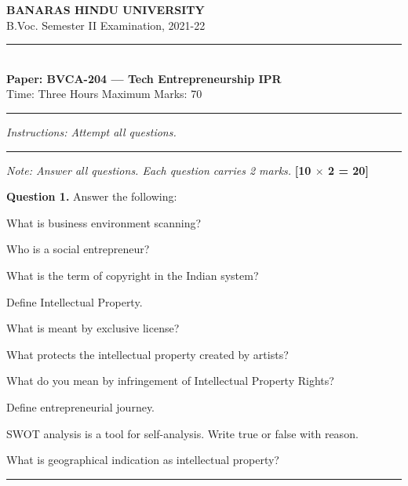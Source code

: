 \documentclass[11pt,a4paper]{article}
\begin{document}
\begin{center}
  {\large\bfseries BANARAS HINDU UNIVERSITY}\\[2pt]
  {\normalsize B.Voc. Semester II Examination, 2021-22}\\[6pt]
  \rule{0.8\linewidth}{0.5pt}\\[6pt]
  {\large\bfseries Paper: BVCA-204 --- Tech Entrepreneurship IPR}\\[4pt]
  {\normalsize Time: Three Hours \hfill Maximum Marks: 70}
\end{center}

\rule{\linewidth}{0.4pt}

\smallskip
\smallskip



\noindent   \textit{Instructions: Attempt all questions.}

\bigskip

\bigskip


\rule{\linewidth}{0.4pt}\smallskip




\noindent   \textit{Note: Answer all questions. Each question carries 2 marks.} \hfill   \textbf{[10 $ \times$ 2 = 20]}

\medskip


\noindent   \textbf{Question 1.} Answer the following:

\begin{parts}
  \item What is business environment scanning?
  \item Who is a social entrepreneur?
  \item What is the term of copyright in the Indian system?
  \item Define Intellectual Property.
  \item What is meant by exclusive license?
  \item What protects the intellectual property created by artists?
  \item What do you mean by infringement of Intellectual Property Rights?
  \item Define entrepreneurial journey.
  \item SWOT analysis is a tool for self-analysis. Write true or false with reason.
  \item What is geographical indication as intellectual property?
\end{parts}

\bigskip


\rule{\linewidth}{0.4pt}\smallskip
\end{document}
